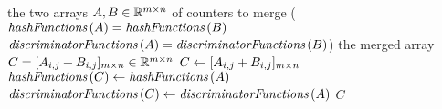 \begin{algorithmic}[1]
  \In the two arrays \( A, B \in \mathbb{R}^{m \times n} \) of counters to merge (\( \hashFunctions (A) = \hashFunctions (B) \) \LAnd{} \( \discriminatorFunctions (A) = \discriminatorFunctions (B) \))
  \Out the merged array \( C = \lbrack A_{i, j} + B_{i, j}\rbrack_{m \times n} \in \mathbb{R}^{m \times n} \)
    \State \( C \gets \lbrack A_{i, j} + B_{i, j}\rbrack_{m \times n} \)
    \State \( \hashFunctions (C) \gets \hashFunctions (A) \)
    \State \( \discriminatorFunctions (C) \gets \discriminatorFunctions (A) \)
    \State \Return \( C \)
  \EndFunction
\end{algorithmic}
